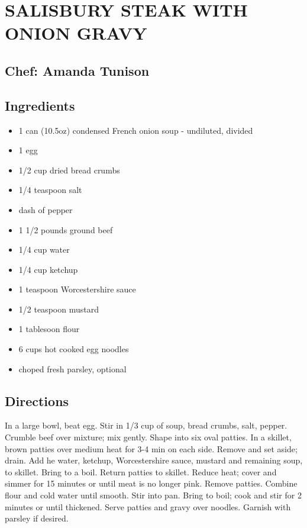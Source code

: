 \documentclass[
]{book}
\providecommand{\tightlist}{%
  \setlength{\itemsep}{0pt}\setlength{\parskip}{0pt}}
\begin{document}
\hypertarget{salisbury-steak-with-onion-gravy}{%
\section*{SALISBURY STEAK WITH ONION GRAVY}\label{salisbury-steak-with-onion-gravy}}


\hypertarget{chef-amanda-tunison-1}{%
\subsection*{Chef: Amanda Tunison}\label{chef-amanda-tunison-1}}


\hypertarget{ingredients-63}{%
\subsection*{Ingredients}\label{ingredients-63}}


\begin{itemize}
\tightlist
\item
  1 can (10.5oz) condensed French onion soup - undiluted, divided
\item
  1 egg
\item
  1/2 cup dried bread crumbs
\item
  1/4 teaspoon salt
\item
  dash of pepper
\item
  1 1/2 pounds ground beef
\item
  1/4 cup water
\item
  1/4 cup ketchup
\item
  1 teaspoon Worcestershire sauce
\item
  1/2 teaspoon mustard
\item
  1 tablesoon flour
\item
  6 cups hot cooked egg noodles
\item
  choped fresh parsley, optional
\end{itemize}

\hypertarget{directions-63}{%
\subsection*{Directions}\label{directions-63}}


In a large bowl, beat egg. Stir in 1/3 cup of soup, bread crumbs, salt, pepper. Crumble beef over mixture;
mix gently. Shape into six oval patties. In a skillet, brown patties over medium heat for 3-4 min on each side.
Remove and set aside; drain. Add he water, ketchup, Worcestershire sauce, mustard and remaining soup, to skillet.
Bring to a boil. Return patties to skillet. Reduce heat; cover and simmer for 15 minutes or until meat is
no longer pink. Remove patties. Combine flour and cold water until smooth. Stir into pan. Bring to boil;
cook and stir for 2 minutes or until thickened. Serve patties and gravy over noodles. Garnish with parsley if desired.
\end{document}
